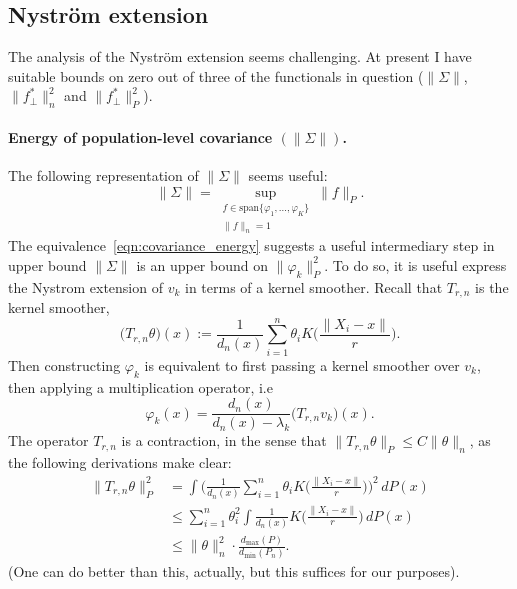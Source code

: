 \documentclass{article}
\newcommand{\1}{\mathbf{1}}
\theoremstyle{definition}
\theoremstyle{remark}
\begin{document}
\subsection{Nystr\"{o}m extension}

The analysis of the Nystr\"{o}m extension seems challenging. At present I have suitable bounds on zero out of three of the functionals in question ($\|\Sigma\|$, $\|f_{\perp}^{\ast}\|_n^2$ and $\|f_{\perp}^{\ast}\|_P^2$). 

\paragraph{Energy of population-level covariance $(\|\Sigma\|)$.}
The following representation of $\|\Sigma\|$ seems useful:
\begin{equation}
\label{eqn:covariance_energy}
\|\Sigma\| = \sup_{\substack{f \in \mathrm{span}\{\varphi_1,\ldots,\varphi_K\} \\ \|f\|_n = 1}} \|f\|_P.
\end{equation}
The equivalence~\eqref{eqn:covariance_energy} suggests a useful intermediary step in upper bound $\|\Sigma\|$ is an upper bound on $\|\varphi_k\|_P^2$. To do so, it is useful express the Nystrom extension of $v_k$ in terms of a kernel smoother. Recall that $T_{r,n}$ is the kernel smoother,
\begin{equation*}
\bigl(T_{r,n}\theta\bigr)(x) := \frac{1}{d_n(x)} \sum_{i = 1}^{n} \theta_i K\biggl(\frac{\|X_i - x\|}{r}\biggr).
\end{equation*}
Then constructing $\varphi_k$ is equivalent to first passing a kernel smoother over $v_k$, then applying a multiplication operator, i.e
\begin{equation}
\label{eqn:nystrom_extension_kernel_smoother_representation}
\varphi_k(x) = \frac{d_n(x)}{d_n(x) - \lambda_k} \bigl(T_{r,n}v_k\bigr)(x).
\end{equation}  
The operator $T_{r,n}$ is a contraction, in the sense that $\|T_{r,n}\theta\|_P \leq C \|\theta\|_n$, as the following derivations make clear:
\begin{align*}
\|T_{r,n}\theta\|_P^2 & = \int \Biggl(\frac{1}{d_n(x)} \sum_{i = 1}^{n} \theta_i K\biggl(\frac{\|X_i - x\|}{r}\biggr)\Biggr)^2 \,dP(x) \\
& \leq \sum_{i = 1}^{n} \theta_i^2 \int \frac{1}{d_n(x)}  K\biggl(\frac{\|X_i - x\|}{r}\biggr) \,dP(x) \\
& \leq \|\theta\|_n^2 \cdot \frac{d_{\max}(P)}{d_{\min}(P_n)}.
\end{align*}
(One can do better than this, actually, but this suffices for our purposes).
\end{document}
